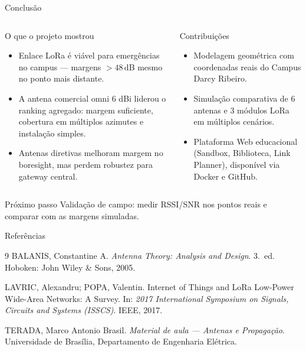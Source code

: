 \documentclass[aspectratio=169]{beamer}
\begin{document}
\begin{frame}{Conclusão}
\vspace{-1.5em}
\small
\begin{columns}[T,onlytextwidth]
\begin{block}{O que o projeto mostrou}
\begin{itemize}
  \item Enlace LoRa é viável para emergências no campus — margens $> 48$\,dB mesmo no ponto mais distante.
  \item A antena comercial omni 6 dBi liderou o ranking agregado: margem suficiente, cobertura em múltiplos azimutes e instalação simples.
  \item Antenas diretivas melhoram margem no boresight, mas perdem robustez para gateway central.
\end{itemize}
\end{block}
\begin{block}{Contribuições}
\begin{itemize}
  \item Modelagem geométrica com coordenadas reais do Campus Darcy Ribeiro.
  \item Simulação comparativa de 6 antenas e 3 módulos LoRa em múltiplos cenários.
  \item Plataforma Web educacional (Sandbox, Biblioteca, Link Planner), disponível via Docker e GitHub.
\end{itemize}
\end{block}
\end{columns}
\begin{block}{Próximo passo}
Validação de campo: medir RSSI/SNR nos pontos reais e comparar com as margens simuladas.
\end{block}
\end{frame}

\begin{frame}{Referências}
\small
\begin{thebibliography}{9}
BALANIS, Constantine A.
\textit{Antenna Theory: Analysis and Design}.
3.~ed. Hoboken: John Wiley \& Sons, 2005.

LAVRIC, Alexandru; POPA, Valentin.
Internet of Things and LoRa\texttrademark{} Low-Power Wide-Area Networks: A Survey.
In: \textit{2017 International Symposium on Signals, Circuits and Systems (ISSCS)}.
IEEE, 2017.

TERADA, Marco Antonio Brasil.
\textit{Material de aula — Antenas e Propagação}.
Universidade de Brasília, Departamento de Engenharia Elétrica.
\end{thebibliography}
\end{frame}
\end{document}
